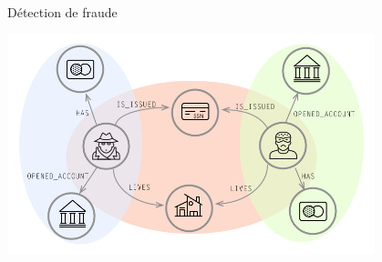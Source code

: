 \begin{frame}{Détection de fraude}
    \begin{center}
        \colorbox{white}{\includegraphics[width=0.8\textwidth]{img/usecase-fraud.png}}
\end{center}
\end{frame}

